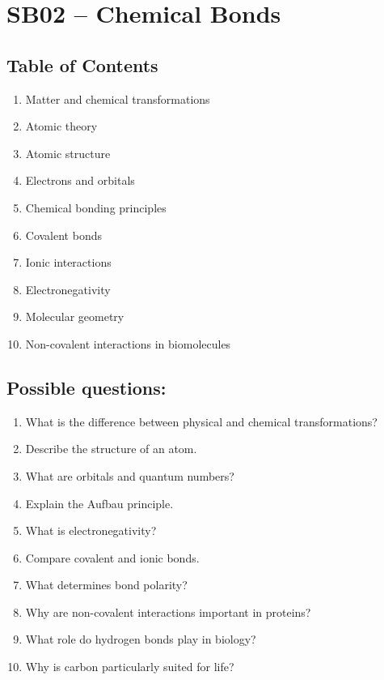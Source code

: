 \section{SB02 -- Chemical Bonds}

\subsection*{Table of Contents}
\begin{enumerate}
\item Matter and chemical transformations
\item Atomic theory
\item Atomic structure
\item Electrons and orbitals
\item Chemical bonding principles
\item Covalent bonds
\item Ionic interactions
\item Electronegativity
\item Molecular geometry
\item Non-covalent interactions in biomolecules
\end{enumerate}

\subsection*{Possible questions:}
\begin{enumerate}
\item{What is the difference between physical and chemical transformations?}
\item{Describe the structure of an atom.}
\item{What are orbitals and quantum numbers?}
\item{Explain the Aufbau principle.}
\item{What is electronegativity?}
\item{Compare covalent and ionic bonds.}
\item{What determines bond polarity?}
\item{Why are non-covalent interactions important in proteins?}
\item{What role do hydrogen bonds play in biology?}
\item{Why is carbon particularly suited for life?}
\end{enumerate}